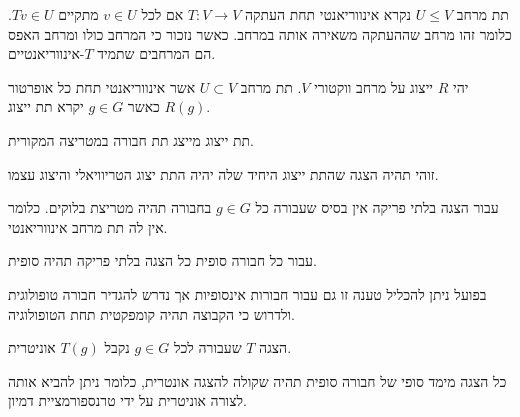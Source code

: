 \documentclass{tstextbook}
\begin{document}
\begin{reminder}
תת מרחב \(U\leq V\) נקרא אינווריאנטי תחת העתקה \(T:V\to V\) אם לכל \(v \in U\) מתקיים \(Tv \in U\). כלומר זהו מרחב שההעתקה משאירה אותה במרחב. כאשר נזכור כי המרחב כולו ומרחב האפס הם המרחבים שתמיד \(T\)-אינווריאנטיים.

\end{reminder}
\begin{definition}[תת יצוג]
יהי \(R\) ייצוג על מרחב ווקטורי \(V\). תת מרחב \(U\subset V\) אשר אינווריאנטי תחת כל אופרטור \(R(g)\) כאשר \(g\in G\) יקרא תת ייצוג.

\end{definition}
\begin{corollary}
תת ייצוג מייצג תת חבורה במטריצה המקורית.

\end{corollary}
\begin{definition}
זוהי תהיה הצגה שהתת ייצוג היחיד שלה יהיה התת יצוג הטריוויאלי והיצוג עצמו.

\end{definition}
\begin{corollary}
עבור הצגה בלתי פריקה אין בסיס שעבורה כל \(g\in G\) בחבורה תהיה מטריצת בלוקים. כלומר אין לה תת מרחב אינווריאנטי.

\end{corollary}
\begin{proposition}
עבור כל חבורה סופית כל הצגה בלתי פריקה תהיה סופית.

\end{proposition}
\begin{remark}
בפועל ניתן להכליל טענה זו גם עבור חבורות אינסופיות אך נדרש להגדיר חבורה טופולוגית ולדרוש כי הקבוצה תהיה קומפקטית תחת הטופולוגיה.

\end{remark}
\begin{definition}
הצגה \(T\) שעבורה לכל \(g \in G\) נקבל \(T(g)\) אוניטרית.

\end{definition}
\begin{proposition}
כל הצגה מימד סופי של חבורה סופית תהיה שקולה להצגה אונטרית, כלומר ניתן להביא אותה לצורה אוניטרית על ידי טרנספורמציית דמיון.

\end{proposition}
\end{document}

